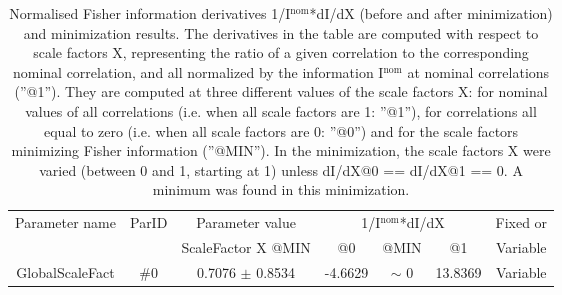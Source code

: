 \begin{table}[H]
\scriptsize
\begin{center}
\renewcommand{\arraystretch}{1.1}
\begin{tabular}{|c|c|c|ccc|c|}
\hline
Parameter name & ParID & Parameter value &\multicolumn{3}{|c|}{1/I$^\mathrm{nom}$*dI/dX} & Fixed or\\
 & & ScaleFactor X @MIN & @0 & @MIN & @1 & Variable\\
\hline
 {\tiny GlobalScaleFact} & \#0 &    0.7076 $\pm$    0.8534 &   -4.6629 & {\tiny $\sim$ }0 &   13.8369 & Variable \\
\hline
\end{tabular}
\renewcommand{\arraystretch}{1}
\caption{Normalised Fisher information derivatives 1/I$^\mathrm{nom}$*dI/dX (before and after minimization) and minimization results.  The derivatives in the table are computed with respect to scale factors X, representing the ratio of a given correlation to the corresponding nominal correlation, and all normalized by the information I$^\mathrm{nom}$ at nominal correlations (''@1''). They are computed at three different values of the scale factors X: for nominal values of all correlations (i.e. when all scale factors are 1: ''@1''), for correlations all equal to zero (i.e. when all scale factors are 0: ''@0'') and for the scale factors minimizing Fisher information (''@MIN''). In the minimization, the scale factors X were varied (between 0 and 1, starting at 1) unless dI/dX@0 == dI/dX@1 == 0. A minimum was found in this minimization.}
\end{center}
\end{table}
